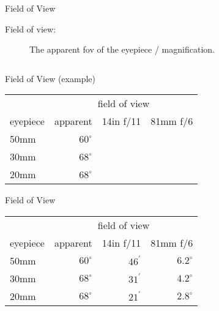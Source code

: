 \begin{frame}{Field of View}
  \begin{description}
    \item[Field of view:] The apparent fov of the eyepiece / magnification.
  \end{description}

  \begin{columns}[T,onlytextwidth]
    \centering

    \centering

  \end{columns}
\end{frame}


\begin{frame}{Field of View (example)}
  \Large
  \begin{table}[]
    \centering
    \begin{tabular}{lrrr}
    \toprule
         & \multicolumn{3}{c}{field of view} \\ \cmidrule(lr){2-4}
    eyepiece & apparent & 14in f/11  & 81mm f/6  \\ \midrule
    50mm & $60^{\circ}$ &  &  \\
    30mm & $68^{\circ}$ &  &  \\
    20mm & $68^{\circ}$ &  &  \\ \bottomrule
    \end{tabular}
  \end{table}
  
  \end{frame}


\begin{frame}{Field of View}
\Large
\begin{table}[]
  \centering
  \begin{tabular}{lrrr}
  \toprule
       & \multicolumn{3}{c}{field of view} \\ \cmidrule(lr){2-4}
  eyepiece & apparent & 14in f/11  & 81mm f/6  \\ \midrule
  50mm & $60^{\circ}$ & $46^{\prime}$ & $6.2^{\circ}$ \\
  30mm & $68^{\circ}$ & $31^{\prime}$ & $4.2^{\circ}$ \\
  20mm & $68^{\circ}$ & $21^{\prime}$ & $2.8^{\circ}$ \\ \bottomrule
  \end{tabular}
\end{table}

\end{frame}


